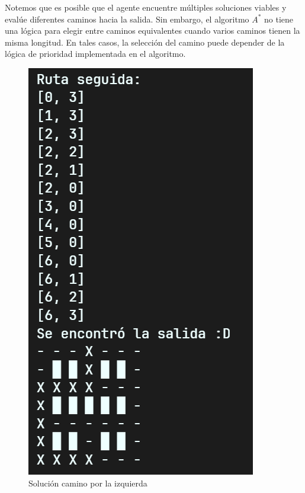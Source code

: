 Notemos que es posible que el agente encuentre múltiples soluciones viables y evalúe
diferentes caminos hacia la salida. Sin embargo, el algoritmo $A^{*}$ no tiene una lógica
para elegir entre caminos equivalentes cuando varios caminos tienen la misma longitud.
En tales casos, la selección del camino puede depender de la lógica de prioridad implementada 
en el algoritmo.

\begin{figure}[H]
    \centering
    \begin{minipage}[b]{4cm}
      \includegraphics[scale = .6]{IMA/RLaberinto2_1.png}
      \caption{Solución camino por la izquierda}
    \end{minipage}
    \hspace{60mm}
    \begin{minipage}[b]{4cm}

\end{minipage}
\end{figure}
